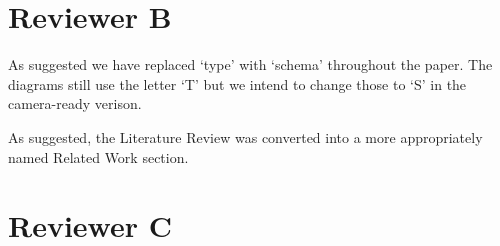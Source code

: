 \documentclass{article}
\begin{document}
\section{Reviewer B}

As suggested we have replaced `type' with `schema' throughout the paper. The diagrams still use the letter `T' but we intend to change those to `S' in the camera-ready verison.

As suggested, the Literature Review was converted into a more appropriately named Related Work section.


\section{Reviewer C}
\end{document}
